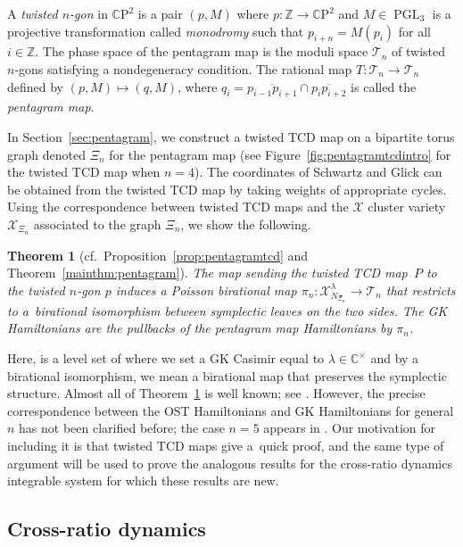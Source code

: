 \documentclass[pdftex]{sigma}
\numberwithin{equation}{section}
\newtheorem{Theorem}{Theorem}[section]
\newcommand{\Z}{{\mathbb Z}}
\newcommand{\C}{{\mathbb C}}
\newcommand{\CP}{{\mathbb C\mathrm P}}
\newcommand{\PGL}{\operatorname{PGL}}
\newcommand{\ra}{\rightarrow}
\begin{document}
	A \emph{twisted $n$-gon} in $\CP^2$ is a pair $(p,M)$ where $p\colon \Z \ra \CP^2$ and $M \in \PGL_{3}$ is a projective transformation called \emph{monodromy} such that $p_{i+n}=M(p_i)$ for all $i \in \Z$. The phase space of the pentagram map is the moduli space $\mathcal T_n$ of twisted $n$-gons satisfying a nondegeneracy condition. The rational map $T\colon \mathcal T_n \ra \mathcal T_n$ defined by $(p,M) \mapsto (q,M)$, where $q_i=\overline{p_{i-1}p_{i+1}}\cap \overline{p_{i}p_{i+2}}$ is called the \textit{pentagram map}.
	
	
	In Section~\ref{sec:pentagram}, we construct a twisted TCD map on a bipartite torus graph denoted $\Xi_n$ for the pentagram map (see Figure~\ref{fig:pentagramtcdintro} for the twisted TCD map when $n=4$). The coordinates of Schwartz \cite{Schwartz} and Glick \cite{Glick} can be obtained from the twisted TCD map by taking weights of appropriate cycles. Using the correspondence between twisted TCD maps and the $\mathcal X$ cluster variety $\mathcal X_{\Xi_n}$ associated to the graph $\Xi_n$, we show the following.

\begin{Theorem} [cf.\ Proposition~\ref{prop:pentagramtcd} and Theorem~\ref{mainthm:pentagram}] \label{thm:pentintro}
The map sending the twisted TCD map~$P$ to the twisted $n$-gon $p$ induces a Poisson birational map $\pi_n\colon \mathcal X_{N_{\Xi_n}}^\lambda \ra \mathcal T_n$ that restricts to a~birational isomorphism between symplectic leaves on the two sides. The GK Hamiltonians are the pullbacks of the pentagram map Hamiltonians by $\pi_n$.
	\end{Theorem}
	
	
	Here,  is a level set of  where we set a GK Casimir equal to $\lambda \in \C^\times$ and by a birational isomorphism, we mean a birational map that preserves the symplectic structure. Almost all of Theorem~\ref{thm:pentintro} is well known; see \cite{FM16,GSTV,GR}. However, the precise correspondence between the OST Hamiltonians and GK Hamiltonians for general $n$ has not been clarified before; the case $n=5$ appears in \cite{GR}. Our motivation for including it is that twisted TCD maps give a~quick proof, and the same type of argument will be used to prove the analogous results for the cross-ratio dynamics integrable system for which these results are new.
	
	
	\subsection{Cross-ratio dynamics}
	\label{subsec:crdynintro}
	
\end{document}
